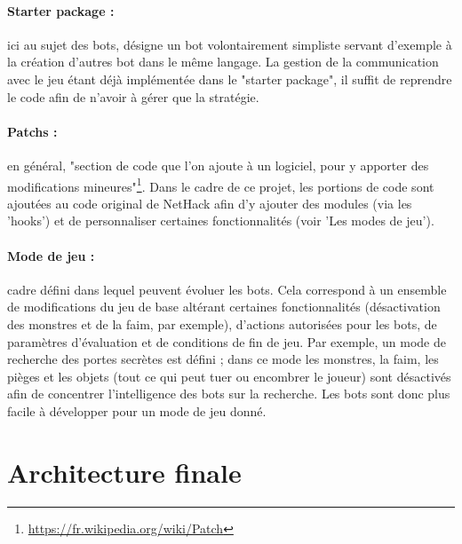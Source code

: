 \documentclass[a4paper,12pt]{article}
\begin{document}
\paragraph{Starter package :}ici au sujet des bots, désigne un bot volontairement
simpliste servant d'exemple à la création d'autres bot dans le même langage.
La gestion de la communication avec le jeu étant déjà implémentée dans le
"starter package", il suffit de reprendre le code afin de n'avoir à gérer que
la stratégie.

\paragraph{Patchs :}en général, "section de code que l'on ajoute à un
logiciel, pour y apporter des modifications
mineures"\footnote{\url{https://fr.wikipedia.org/wiki/Patch}}. Dans le cadre
de ce projet, les portions de code sont ajoutées au code original de NetHack
afin d'y ajouter des modules (via les 'hooks') et de personnaliser certaines
fonctionnalités (voir 'Les modes de jeu').

\paragraph{Mode de jeu :}cadre défini dans lequel peuvent évoluer les bots.
Cela correspond à un ensemble de modifications du jeu de base altérant
certaines fonctionnalités (désactivation des monstres et de la faim, par
exemple), d'actions autorisées pour les bots, de paramètres d'évaluation et de
conditions de fin de jeu.
Par exemple, un mode de recherche des portes secrètes est défini ; dans ce
mode les monstres, la faim, les pièges et les objets (tout ce qui peut tuer ou
encombrer le joueur) sont désactivés afin de concentrer l'intelligence des
bots sur la recherche. Les bots sont donc plus facile à développer pour un
mode de jeu donné.

\section{Architecture finale}
\end{document}
